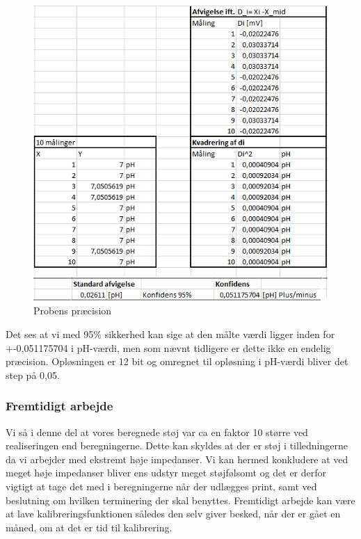  \begin{figure}[H]
	\centering 
	\includegraphics[scale=1]{HardwareArkitektur/Sensore/pH_probe_billeder/Probe_afvigelse.PNG}
	\caption{Probens præcision}
	\label{photo:probe_afvigelse}
\end{figure} 

Det ses at vi med 95\% sikkerhed kan sige at den målte værdi ligger inden for +-0,051175704 i pH-værdi, men som nævnt tidligere er dette ikke en endelig præcision. Opløsningen er 12 bit og omregnet til opløsning i pH-værdi bliver det step på 0,05.   

\subsubsection{Fremtidigt arbejde}
Vi så i denne del at vores beregnede støj var ca en faktor 10 større ved realiseringen end beregningerne. Dette kan skyldes at der er støj i tilledningerne da vi arbejder med ekstremt høje impedanser. Vi kan hermed konkludere at ved meget høje impedanser bliver ens udstyr meget støjfølsomt og det er derfor vigtigt at tage det med i beregningerne når der udlægges print, samt ved beslutning om hvilken terminering der skal benyttes. Fremtidigt arbejde kan være at lave kalibreringsfunktionen således den selv giver besked, når der er gået en måned, om at det er tid til kalibrering. 




